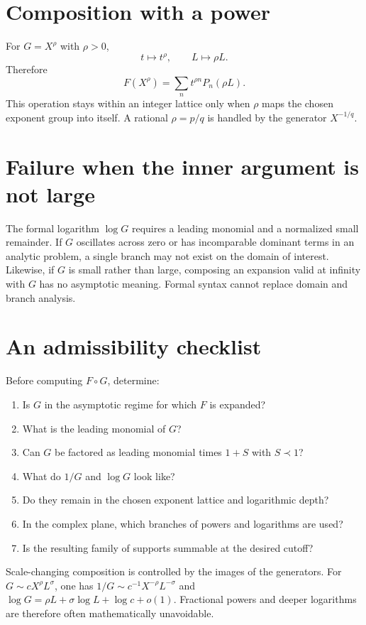 \documentclass[11pt,oneside]{book}
\theoremstyle{definition}
\theoremstyle{remark}
\newcommand{\precdom}{\prec}
\newcommand{\compose}{\mathbin{\circ}}
\begin{document}
\section{Composition with a power}
For $G=X^\rho$ with $\rho>0$,
\[
 t\mapsto t^\rho,
 \qquad
 L\mapsto\rho L.
\]
Therefore
\begin{equation}\label{eq:composition-power}
 F(X^\rho)=\sum_n t^{\rho n}P_n(\rho L).
\end{equation}
This operation stays within an integer lattice only when $\rho$ maps the
chosen exponent group into itself.  A rational $\rho=p/q$ is handled by the
generator $X^{-1/q}$.

\section{Failure when the inner argument is not large}
The formal logarithm $\log G$ requires a leading monomial and a normalized
small remainder.  If $G$ oscillates across zero or has incomparable dominant
terms in an analytic problem, a single branch may not exist on the domain of
interest.  Likewise, if $G$ is small rather than large, composing an expansion
valid at infinity with $G$ has no asymptotic meaning.  Formal syntax cannot
replace domain and branch analysis.

\section{An admissibility checklist}
Before computing $F\compose G$, determine:
\begin{enumerate}
\item Is $G$ in the asymptotic regime for which $F$ is expanded?
\item What is the leading monomial of $G$?
\item Can $G$ be factored as leading monomial times $1+S$ with $S\precdom1$?
\item What do $1/G$ and $\log G$ look like?
\item Do they remain in the chosen exponent lattice and logarithmic depth?
\item In the complex plane, which branches of powers and logarithms are used?
\item Is the resulting family of supports summable at the desired cutoff?
\end{enumerate}

\begin{summarybox}
Scale-changing composition is controlled by the images of the generators.
For $G\sim cX^\rho L^\sigma$, one has
$1/G\sim c^{-1}X^{-\rho}L^{-\sigma}$ and
$\log G=\rho L+\sigma\log L+\log c+o(1)$.  Fractional powers and deeper
logarithms are therefore often mathematically unavoidable.
\end{summarybox}
\end{document}
